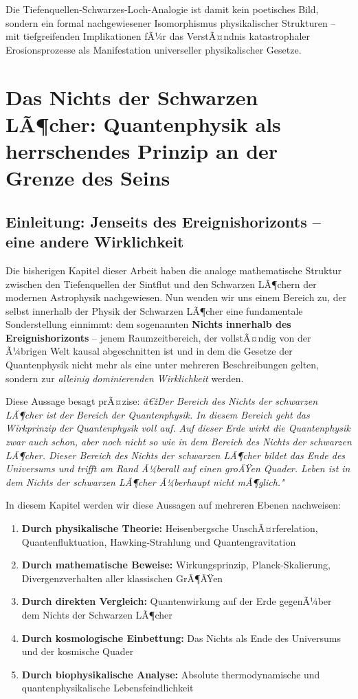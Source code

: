 ﻿\documentclass[12pt,a4paper]{report}
\begin{document}
Die Tiefenquellen-Schwarzes-Loch-Analogie ist damit kein poetisches Bild, sondern ein formal nachgewiesener Isomorphismus physikalischer Strukturen -- mit tiefgreifenden Implikationen fÃ¼r das VerstÃ¤ndnis katastrophaler Erosionsprozesse als Manifestation universeller physikalischer Gesetze.

\chapter{Das Nichts der Schwarzen LÃ¶cher: Quantenphysik als herrschendes Prinzip an der Grenze des Seins}
\label{sec:nichts_quanten}

\section{Einleitung: Jenseits des Ereignishorizonts -- eine andere Wirklichkeit}

Die bisherigen Kapitel dieser Arbeit haben die analoge mathematische Struktur zwischen den Tiefenquellen der Sintflut und den Schwarzen LÃ¶chern der modernen Astrophysik nachgewiesen. Nun wenden wir uns einem Bereich zu, der selbst innerhalb der Physik der Schwarzen LÃ¶cher eine fundamentale Sonderstellung einnimmt: dem sogenannten \textbf{Nichts innerhalb des Ereignishorizonts} -- jenem Raumzeitbereich, der vollstÃ¤ndig von der Ã¼brigen Welt kausal abgeschnitten ist und in dem die Gesetze der Quantenphysik nicht mehr als eine unter mehreren Beschreibungen gelten, sondern zur \emph{alleinig dominierenden Wirklichkeit} werden.

Diese Aussage besagt prÃ¤zise: \textit{â€žDer Bereich des Nichts der schwarzen LÃ¶cher ist der Bereich der Quantenphysik. In diesem Bereich geht das Wirkprinzip der Quantenphysik voll auf. Auf dieser Erde wirkt die Quantenphysik zwar auch schon, aber noch nicht so wie in dem Bereich des Nichts der schwarzen LÃ¶cher. Dieser Bereich des Nichts der schwarzen LÃ¶cher bildet das Ende des Universums und trifft am Rand Ã¼berall auf einen groÃŸen Quader. Leben ist in dem Nichts der schwarzen LÃ¶cher Ã¼berhaupt nicht mÃ¶glich."}

In diesem Kapitel werden wir diese Aussagen auf mehreren Ebenen nachweisen:
\begin{enumerate}
    \item \textbf{Durch physikalische Theorie:} Heisenbergsche UnschÃ¤rferelation, Quantenfluktuation, Hawking-Strahlung und Quantengravitation
    \item \textbf{Durch mathematische Beweise:} Wirkungsprinzip, Planck-Skalierung, Divergenzverhalten aller klassischen GrÃ¶ÃŸen
    \item \textbf{Durch direkten Vergleich:} Quantenwirkung auf der Erde gegenÃ¼ber dem Nichts der Schwarzen LÃ¶cher
    \item \textbf{Durch kosmologische Einbettung:} Das Nichts als Ende des Universums und der kosmische Quader
    \item \textbf{Durch biophysikalische Analyse:} Absolute thermodynamische und quantenphysikalische Lebensfeindlichkeit
\end{enumerate}
\end{document}
